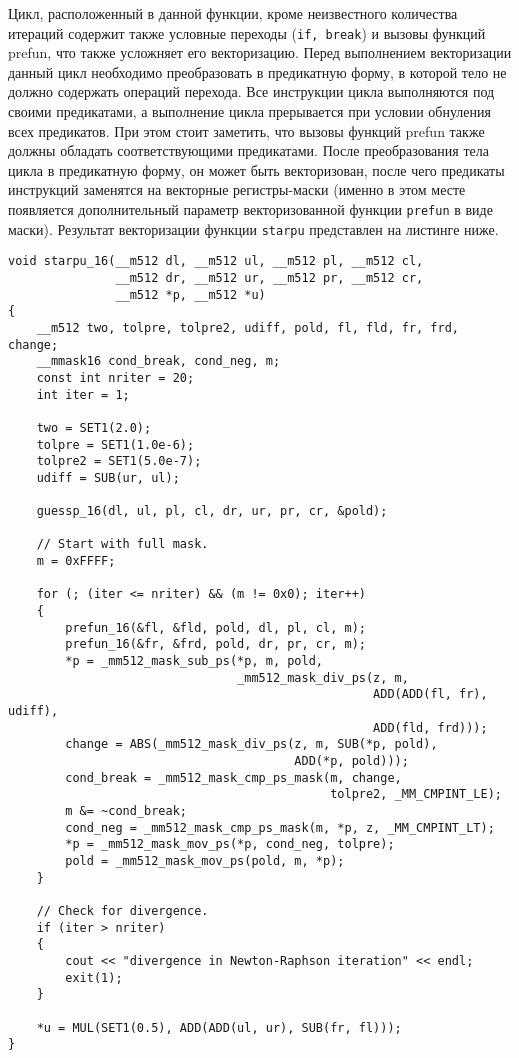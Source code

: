 \documentclass[
11pt,%
tightenlines,%
twoside,%
onecolumn,%
nofloats,%
nobibnotes,%
nofootinbib,%
superscriptaddress,%
noshowpacs,%
centertags]%
{revtex4}
\begin{document}
Цикл, расположенный в данной функции, кроме неизвестного количества итераций содержит также условные переходы (\texttt{if, break}) и вызовы функций prefun, что также усложняет его векторизацию.
Перед выполнением векторизации данный цикл необходимо преобразовать в предикатную форму, в которой тело не должно содержать операций перехода.
Все инструкции цикла выполняются под своими предикатами, а выполнение цикла прерывается при условии обнуления всех предикатов.
При этом стоит заметить, что вызовы функций prefun также должны обладать соответствующими предикатами.
После преобразования тела цикла в предикатную форму, он может быть векторизован, после чего предикаты инструкций заменятся на векторные регистры-маски (именно в этом месте появляется дополнительный параметр векторизованной функции \texttt{prefun} в виде маски).
Результат векторизации функции \texttt{starpu} представлен на листинге ниже.

\begin{lstlisting}[caption={Векторизованная версия функции \texttt{starpu}.},label={lst:prac_riemann_starpu_vec}]
void starpu_16(__m512 dl, __m512 ul, __m512 pl, __m512 cl,
               __m512 dr, __m512 ur, __m512 pr, __m512 cr,
               __m512 *p, __m512 *u)
{
    __m512 two, tolpre, tolpre2, udiff, pold, fl, fld, fr, frd, change;
    __mmask16 cond_break, cond_neg, m;
    const int nriter = 20;
    int iter = 1;

    two = SET1(2.0);
    tolpre = SET1(1.0e-6);
    tolpre2 = SET1(5.0e-7);
    udiff = SUB(ur, ul);

    guessp_16(dl, ul, pl, cl, dr, ur, pr, cr, &pold);

    // Start with full mask.
    m = 0xFFFF;

    for (; (iter <= nriter) && (m != 0x0); iter++)
    {
        prefun_16(&fl, &fld, pold, dl, pl, cl, m);
        prefun_16(&fr, &frd, pold, dr, pr, cr, m);
        *p = _mm512_mask_sub_ps(*p, m, pold,
                                _mm512_mask_div_ps(z, m,
                                                   ADD(ADD(fl, fr), udiff),
                                                   ADD(fld, frd)));
        change = ABS(_mm512_mask_div_ps(z, m, SUB(*p, pold),
                                        ADD(*p, pold)));
        cond_break = _mm512_mask_cmp_ps_mask(m, change,
                                             tolpre2, _MM_CMPINT_LE);
        m &= ~cond_break;
        cond_neg = _mm512_mask_cmp_ps_mask(m, *p, z, _MM_CMPINT_LT);
        *p = _mm512_mask_mov_ps(*p, cond_neg, tolpre);
        pold = _mm512_mask_mov_ps(pold, m, *p);
    }

    // Check for divergence.
    if (iter > nriter)
    {
        cout << "divergence in Newton-Raphson iteration" << endl;
        exit(1);
    }

    *u = MUL(SET1(0.5), ADD(ADD(ul, ur), SUB(fr, fl)));
}
\end{lstlisting}
\end{document}

